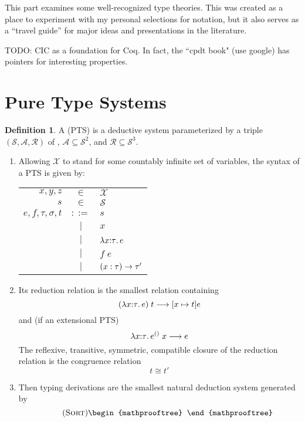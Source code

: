 \documentclass[11pt]{article} %
\theoremstyle{definition}
\newtheorem{definition}{Definition}
\theoremstyle{remark}
\begin{document}
This part examines some well-recognized type theories.
This was created as a place to experiment with my personal selections for notation, but it also serves as a ``travel guide'' for major ideas and presentations in the literature.

TODO: CIC as a foundation for Coq. In fact, the ``cpdt book" (use google) has pointers for interesting properties.

\section{Pure Type Systems}

\begin{definition}
A  (PTS) is a deductive system parameterized by a triple $(\mathcal S, \mathcal A, \mathcal R)$ of ,  $\mathcal A \subseteq \mathcal S^2$, and  $\mathcal R \subseteq \mathcal S^3$.
\begin{enumerate}[label=\textit{\roman*})]
\item
  Allowing $\mathcal X$ to stand for some countably infinite set of variables, the syntax of a PTS is given by:
  \begin{center}
  \begin{tabular}{rcl}
  $x,y,z$ & $\in$ & $\mathcal X$ \\
  $s$ & $\in$ & $\mathcal S$ \\
  $e,f,\tau,\sigma, t$ & $::=$ & $s$ \\
    & $\mid$ & $x$ \\
    & $\mid$ & ${\lambda}{x \mathord: \tau}.\,e$ \\
    & $\mid$ & $f\;e$ \\
    & $\mid$ & $({x}:{\tau}) \to \tau'$ \\
  \end{tabular}
  \end{center}
\item
  Its reduction relation is the smallest relation containing
    $$({\lambda}{x \mathord: \tau}.\,e)\;t \longrightarrow [x \mapsto t]e$$
  and (if an extensional PTS)
    $${\lambda}{x \mathord: \tau}.\,e^{()}\;x \longrightarrow e$$
  The reflexive, transitive, symmetric, compatible closure of the reduction relation is the congruence relation
    $$t \cong t'$$
\item
  Then typing derivations are the smallest natural deduction system generated by
  \begin{equation}\tag{\textsc{Sort}}
  \begin{mathprooftree}

\end{mathprooftree}
\end{equation}
\end{enumerate}
\end{definition}
\end{document}
